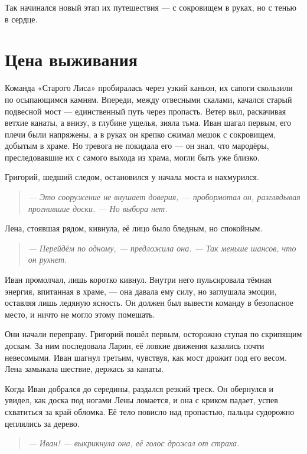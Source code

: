 \documentclass[12pt,a4paper]{book} %
\newenvironment{dialogue}{\begin{quote}\itshape}{\end{quote}}
\begin{document}
Так начинался новый этап их путешествия --- с сокровищем в руках, но с тенью в сердце.

\chapter{Цена выживания}

Команда «Старого Лиса» пробиралась через узкий каньон, их сапоги скользили по осыпающимся камням. Впереди, между отвесными скалами, качался старый подвесной мост --- единственный путь через пропасть. Ветер выл, раскачивая ветхие канаты, а внизу, в глубине ущелья, зияла тьма. Иван шагал первым, его плечи были напряжены, а в руках он крепко сжимал мешок с сокровищем, добытым в храме. Но тревога не покидала его --- он знал, что мародёры, преследовавшие их с самого выхода из храма, могли быть уже близко.

Григорий, шедший следом, остановился у начала моста и нахмурился.

\begin{dialogue}
--- Это сооружение не внушает доверия, --- пробормотал он, разглядывая прогнившие доски. --- Но выбора нет.
\end{dialogue}

Лена, стоявшая рядом, кивнула, её лицо было бледным, но спокойным.

\begin{dialogue}
--- Перейдём по одному, --- предложила она. --- Так меньше шансов, что он рухнет.
\end{dialogue}

Иван промолчал, лишь коротко кивнул. Внутри него пульсировала тёмная энергия, впитанная в храме, --- она давала ему силу, но заглушала эмоции, оставляя лишь ледяную ясность. Он должен был вывести команду в безопасное место, и ничто не могло этому помешать.

Они начали переправу. Григорий пошёл первым, осторожно ступая по скрипящим доскам. За ним последовала Ларин, её ловкие движения казались почти невесомыми. Иван шагнул третьим, чувствуя, как мост дрожит под его весом. Лена замыкала шествие, держась за канаты.

Когда Иван добрался до середины, раздался резкий треск. Он обернулся и увидел, как доска под ногами Лены ломается, и она с криком падает, успев схватиться за край обломка. Её тело повисло над пропастью, пальцы судорожно цеплялись за дерево.

\begin{dialogue}
--- Иван! --- выкрикнула она, её голос дрожал от страха.
\end{dialogue}
\end{document}
